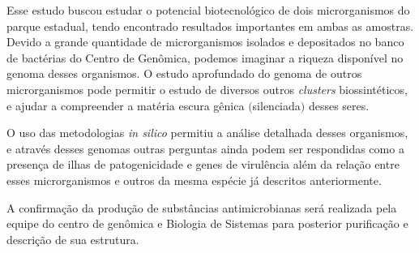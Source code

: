 Esse estudo buscou estudar o potencial biotecnológico de dois microrganismos do parque estadual, tendo
encontrado resultados importantes em ambas as amostras. Devido a grande quantidade de microrganismos
isolados e depositados no banco de bactérias do Centro de Genômica, podemos imaginar a riqueza 
disponível no genoma desses organismos. O estudo aprofundado do genoma de outros microrganismos pode
permitir o estudo de diversos outros \textit{clusters} biossintéticos, e ajudar a compreender
a matéria escura gênica $($silenciada$)$ desses seres. 

O uso das metodologias \textit{in silico} permitiu a análise detalhada desses organismos, e através desses genomas
outras perguntas ainda  podem ser respondidas como a presença de ilhas de patogenicidade e genes de virulência
além da relação entre esses microrganismos e outros da mesma espécie já descritos anteriormente.

A confirmação da produção de substâncias antimicrobianas será realizada pela equipe do centro de genômica
e Biologia de Sistemas para posterior purificação e descrição de sua estrutura.